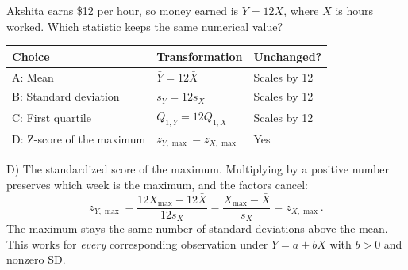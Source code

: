 \documentclass[11pt]{article}
\newcommand{\ans}[1]{\textcolor{AnswerBlue}{#1}}
\begin{document}
Akshita earns \$12 per hour, so money earned is $Y=12X$, where $X$ is hours worked. Which statistic keeps the same numerical value?

\begin{center}
\begin{tabular}{lll}
\toprule
Choice & Transformation & Unchanged?\\
\midrule
A: Mean & $\bar{Y}=12\bar{X}$ & Scales by 12\\
B: Standard deviation & $s_Y=12s_X$ & Scales by 12\\
C: First quartile & $Q_{1,Y}=12Q_{1,X}$ & Scales by 12\\
D: Z-score of the maximum & $z_{Y,\max}=z_{X,\max}$ & Yes\\
\bottomrule
\end{tabular}
\end{center}

\begin{answerbox}
\ans{D) The standardized score of the maximum.} Multiplying by a positive number preserves which week is the maximum, and the factors cancel:
\[
z_{Y,\max}
=\frac{12X_{\max}-12\bar{X}}{12s_X}
=\frac{X_{\max}-\bar{X}}{s_X}
=z_{X,\max}.
\]
The maximum stays the same number of standard deviations above the mean. This works for \emph{every} corresponding observation under $Y=a+bX$ with $b>0$ and nonzero SD.
\end{answerbox}
\end{document}
